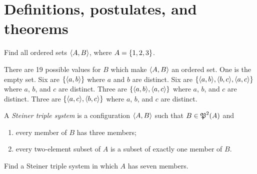 \documentclass{report}
\begin{document}
\section{Definitions, postulates, and theorems}
\begin{exercise}
Find all ordered sets $\left\langle A,B\right\rangle$, where $A = \left\{1, 2, 3\right\}$.
\end{exercise}

\begin{solution}
There are 19 possible values for $B$ which make $\left\langle A,B\right\rangle$ an ordered set.
One is the empty set.
Six are $\left\{\left\langle a,b\right\rangle\right\}$ where $a$ and $b$ are distinct.
Six are $\set{\aprn{a,b},\aprn{b,c},\aprn{a,c}}$ where $a$, $b$, and $c$ are distinct.
Three are $\set{\aprn{a,b},\aprn{a,c}}$ where $a$, $b$, and $c$ are distinct.
Three are $\set{\aprn{a,c},\aprn{b,c}}$ where $a$, $b$, and $c$ are distinct.
\end{solution}

\begin{exercise}
A \textit{Steiner triple system} is a configuration $\left\langle A, B\right\rangle$ such that $B\in\operatorname{\mathfrak{P}}^2(A)$ and
\begin{enumerate}[label=(\alph*)]
    \item every member of $B$ has three members;
    \item every two-element subset of $A$ is a subset of exactly one member of $B$.
\end{enumerate}
Find a Steiner triple system in which $A$ has seven members.
\end{exercise}
\end{document}
